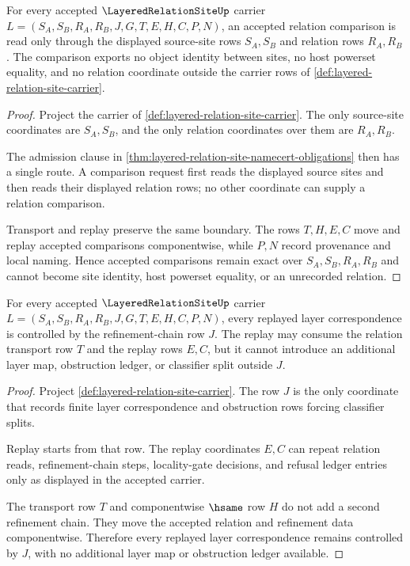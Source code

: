 \begin{theorem}
\label{thm:layered-relation-site-relation-admission-exactness}
For every accepted $\LayeredRelationSiteUp$ carrier $L=(S_A,S_B,R_A,R_B,J,G,T,E,H,C,P,N)$, an accepted relation comparison is read only through the displayed source-site rows $S_A,S_B$ and relation rows $R_A,R_B$. The comparison exports no object identity between sites, no host powerset equality, and no relation coordinate outside the carrier rows of \autoref{def:layered-relation-site-carrier}.
\end{theorem}
\begin{proof}
Project the carrier of \autoref{def:layered-relation-site-carrier}. The only source-site coordinates are $S_A,S_B$, and the only relation coordinates over them are $R_A,R_B$.

The admission clause in \autoref{thm:layered-relation-site-namecert-obligations} then has a single route. A comparison request first reads the displayed source sites and then reads their displayed relation rows; no other coordinate can supply a relation comparison.

Transport and replay preserve the same boundary. The rows $T,H,E,C$ move and replay accepted comparisons componentwise, while $P,N$ record provenance and local naming. Hence accepted comparisons remain exact over $S_A,S_B,R_A,R_B$ and cannot become site identity, host powerset equality, or an unrecorded relation.
\end{proof}

\begin{theorem}
\label{thm:layered-relation-site-refinement-replay}
For every accepted $\LayeredRelationSiteUp$ carrier $L=(S_A,S_B,R_A,R_B,J,G,T,E,H,C,P,N)$, every replayed layer correspondence is controlled by the refinement-chain row $J$. The replay may consume the relation transport row $T$ and the replay rows $E,C$, but it cannot introduce an additional layer map, obstruction ledger, or classifier split outside $J$.
\end{theorem}
\begin{proof}
Project \autoref{def:layered-relation-site-carrier}. The row $J$ is the only coordinate that records finite layer correspondence and obstruction rows forcing classifier splits.

Replay starts from that row. The replay coordinates $E,C$ can repeat relation reads, refinement-chain steps, locality-gate decisions, and refusal ledger entries only as displayed in the accepted carrier.

The transport row $T$ and componentwise $\hsame$ row $H$ do not add a second refinement chain. They move the accepted relation and refinement data componentwise. Therefore every replayed layer correspondence remains controlled by $J$, with no additional layer map or obstruction ledger available.
\end{proof}

